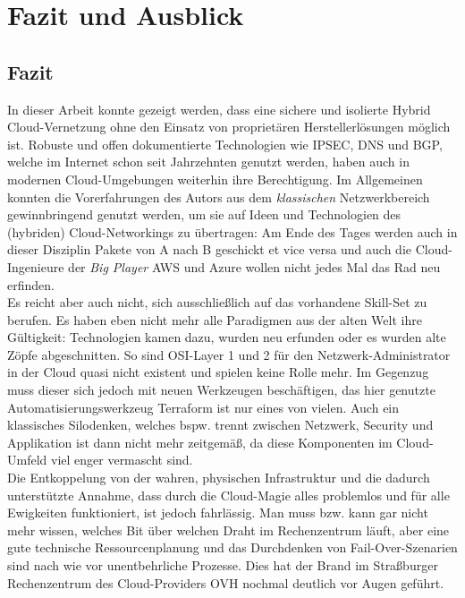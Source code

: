 \chapter{Fazit und Ausblick} \label{Fazit und Ausblick}

\section{Fazit}
In dieser Arbeit konnte gezeigt werden, dass eine sichere und isolierte Hybrid Cloud-Vernetzung ohne den Einsatz von proprietären Herstellerlösungen möglich ist. Robuste und offen dokumentierte Technologien wie IPSEC, DNS und BGP, welche im Internet schon seit Jahrzehnten genutzt werden, haben auch in \glqq modernen\grqq{} Cloud-Umgebungen weiterhin ihre Berechtigung. Im Allgemeinen konnten die Vorerfahrungen des Autors aus dem \textit{klassischen} Netzwerkbereich gewinnbringend genutzt werden, um sie auf Ideen und Technologien des (hybriden) Cloud-Networkings zu übertragen: Am Ende des Tages werden auch in dieser Disziplin Pakete von A nach B geschickt et vice versa und auch die Cloud-Ingenieure der \textit{Big Player} AWS und Azure wollen nicht jedes Mal das Rad neu erfinden.\\
Es reicht aber auch nicht, sich ausschließlich auf das vorhandene Skill-Set zu berufen. Es haben eben nicht mehr alle Paradigmen aus der \glqq alten Welt\grqq{} ihre Gültigkeit: Technologien kamen dazu, wurden neu erfunden oder es wurden alte Zöpfe abgeschnitten. So sind OSI-Layer 1 und 2 für den Netzwerk-Administrator in der Cloud quasi nicht existent und spielen keine Rolle mehr. Im Gegenzug muss dieser sich jedoch mit neuen Werkzeugen beschäftigen, das hier genutzte Automatisierungswerkzeug Terraform ist nur eines von vielen. Auch ein klassisches Silodenken, welches bspw. trennt zwischen Netzwerk, Security und Applikation ist dann nicht mehr zeitgemäß, da diese Komponenten im Cloud-Umfeld viel enger vermascht sind.\\
Die Entkoppelung von der \glqq wahren\grqq{}, physischen Infrastruktur und die dadurch unterstützte Annahme, dass durch die \glqq Cloud-Magie\grqq{} alles problemlos und für alle Ewigkeiten funktioniert, ist jedoch fahrlässig. Man muss bzw. kann gar nicht mehr wissen, \glqq welches Bit über welchen Draht im Rechenzentrum läuft\grqq{}, aber eine gute technische Ressourcenplanung und das Durchdenken von Fail-Over-Szenarien sind nach wie vor unentbehrliche Prozesse. Dies hat der Brand im Straßburger Rechenzentrum des Cloud-Providers OVH nochmal deutlich vor Augen geführt.\\
